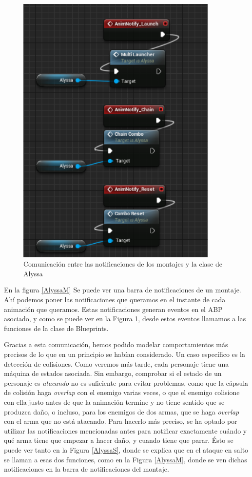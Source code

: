 \begin{figure}[H]
  \centering
  \includegraphics[width=10cm]{./images/Notifs_ABP.png}
  \caption{Comunicación entre las notificaciones de los montajes y la clase de Alyssa}
  \label{AlyssaABP}
\end{figure}


En la figura \ref{AlyssaM} Se puede ver una barra de notificaciones de un montaje. Ahí podemos poner las notificaciones que queramos en el instante de cada animación que queramos. Estas notificaciones generan eventos en el \ac{ABP} asociado, y como se puede ver en la Figura \ref{AlyssaABP}, desde estos eventos llamamos a las funciones de la clase de Blueprints.


Gracias a esta comunicación, hemos podido modelar comportamientos más precisos de lo que en un principio se habían considerado. Un caso específico es la detección de colisiones. Como veremos más tarde, cada personaje tiene una máquina de estados asociada. Sin embargo, comprobar si el estado de un personaje es \textit{atacando} no es suficiente para evitar problemas, como que la cápsula de colisión haga \textit{overlap} con el enemigo varias veces, o que el enemigo colisione con ella justo antes de que la animación termine y no tiene sentido que se produzca daño, o incluso, para los enemigos de dos armas, que se haga \textit{overlap} con el arma que no está atacando. Para hacerlo más preciso, se ha optado por utilizar las notificaciones mencionadas antes para notificar exactamente cuándo y qué arma tiene que empezar a hacer daño, y cuando tiene que parar. Ésto se puede ver tanto en la Figura \ref{AlyssaS}, donde se explica que en el ataque en salto se llaman a esas dos funciones, como en la Figura \ref{AlyssaM}, donde se ven dichas notificaciones en la barra de notificaciones del montaje.

